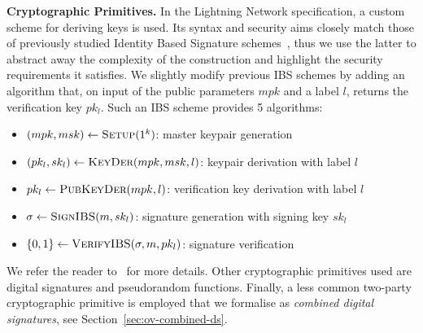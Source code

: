   \noindent \textbf{Cryptographic Primitives.}
    In the Lightning Network specification, a custom scheme for deriving keys is
    used. Its syntax and security aims closely match those of previously studied
    Identity Based Signature schemes~\cite{ibsshamir,ibspaterson}, thus we use
    the latter to abstract away the complexity of the construction and highlight
    the security requirements it satisfies. We slightly modify previous IBS
    schemes by adding an algorithm that, on input of the public parameters $mpk$
    and a label $l$, returns the verification key $pk_l$. Such an IBS scheme
    provides 5 algorithms:
    \begin{itemize}
      \item $(mpk, msk) \leftarrow \textsc{Setup}(1^k)$: master keypair
      generation
      \item $(pk_l, sk_l) \leftarrow \textsc{KeyDer}(mpk, msk, l)$: keypair
      derivation with label $l$
      \item $pk_l \leftarrow \textsc{PubKeyDer}(mpk, l)$: verification key
      derivation with label $l$
      \item $\sigma \leftarrow \textsc{SignIBS}(m, sk_l)$: signature generation
      with signing key $sk_l$
      \item $\{0, 1\} \leftarrow \textsc{VerifyIBS}(\sigma, m, pk_l)$: signature
      verification
    \end{itemize}
    We refer the reader to~\cite{ibspaterson} for more details. Other
    cryptographic primitives used are digital signatures and pseudorandom
    functions. Finally, a less common two-party cryptographic primitive is
    employed that we formalise as \emph{combined digital signatures}, see
    Section~\ref{sec:ov-combined-ds}.
